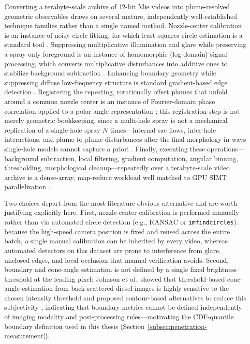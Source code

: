 Converting a terabyte-scale archive of 12-bit Mie videos into plume-resolved geometric observables draws on several mature, independently well-established technique families rather than a single named method. Nozzle-center calibration is an instance of noisy circle fitting, for which least-squares circle estimation is a standard tool \cite{Pratt1987CircleFit,Taubin1991CircleFit}. Suppressing multiplicative illumination and glare while preserving a spray-only foreground is an instance of homomorphic (log-domain) signal processing, which converts multiplicative disturbances into additive ones to stabilize background subtraction \cite{OppenheimSchaferStockham1968,GonzalezWoodsDIP}. Enhancing boundary geometry while suppressing diffuse low-frequency structure is standard gradient-based edge detection \cite{GonzalezWoodsDIP,Szeliski2011Vision,ZackRogersLatt1977}. Registering the repeating, rotationally offset plumes that unfold around a common nozzle center is an instance of Fourier-domain phase correlation applied to a polar-angle representation \cite{KuglinHines1975PhaseCorrelation,DeCastroMorandi1987RotationFFT}; this registration step is not merely geometric bookkeeping, since a multi-hole spray is not a mechanical replication of a single-hole spray $N$ times---internal sac flows, inter-hole interactions, and plume-to-plume disturbances alter the final morphology in ways single-hole models cannot capture a priori \cite{JinKimKakamiNishidaOgataLuo2020,MopuriGrahnSedarskyHyvonen2024}. Finally, executing these operations---background subtraction, local filtering, gradient computation, angular binning, thresholding, morphological cleanup---repeatedly over a terabyte-scale video archive is a dense-array, map-reduce workload well matched to GPU SIMT parallelization \cite{NickollsBuckGarlandSkadron2008}.

Two choices depart from the most literature-obvious alternative and are worth justifying explicitly here. First, nozzle-center calibration is performed manually rather than via automated circle detection (e.g., RANSAC or \texttt{imfindcircles}): because the high-speed camera position is fixed and reused across the entire batch, a single manual calibration can be inherited by every video, whereas automated detectors on this dataset are prone to interference from glare, unclosed edges, and local occlusion that manual verification avoids. Second, boundary and cone-angle estimation is not defined by a single fixed brightness threshold at the leading pixel: Johnson et al.\ showed that threshold-based cone-angle estimation from back-scattered diesel images is highly sensitive to the chosen intensity threshold and proposed contour-based alternatives to reduce this subjectivity \cite{JohnsonNaberLee2012}, indicating that boundary metrics cannot be defined independently of imaging modality and post-processing rules---motivating the CDF-quantile boundary definition used in this thesis (Section~\ref{subsec:penetration-measurement}).

